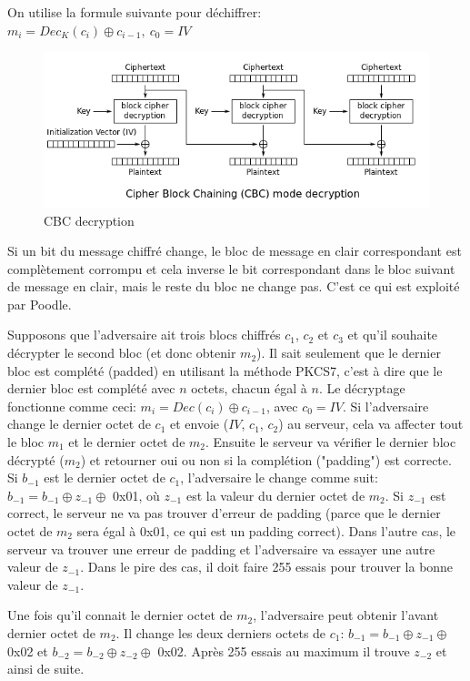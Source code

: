 \noindent On utilise la formule suivante pour déchiffrer: \\
$m_i = Dec_K(c_i) \oplus c_{i-1},\ c_0 = IV$ 

\begin{figure}[H]
\includegraphics[scale=0.6]{img/cbc-dec.png}
\caption{CBC decryption}
\label{cbc-dec}
\end{figure}

Si un bit du message chiffré change, le bloc de message en clair correspondant est complètement corrompu et cela inverse le bit correspondant dans le bloc suivant de message en clair, mais le reste du bloc ne change pas. C'est ce qui est exploité par Poodle.

Supposons que l'adversaire ait trois blocs chiffrés $c_1$, $c_2$ et $c_3$ et qu'il souhaite décrypter le second bloc (et donc obtenir $m_2$). Il sait seulement que le dernier bloc est complété (padded) en utilisant la méthode PKCS7, c'est à dire que le dernier bloc est complété avec $n$ octets, chacun égal à $n$.
Le décryptage fonctionne comme ceci: $m_i = Dec(c_i) \oplus c_{i-1}$, avec $c_0 = IV$. Si l'adversaire change le dernier octet de $c_1$ et envoie ($IV$, $c_1$, $c_2$) au serveur, cela va affecter tout le bloc $m_1$ et le dernier octet de $m_2$. Ensuite le serveur va vérifier le dernier bloc décrypté ($m_2$) et retourner oui ou non si la complétion ("padding") est correcte.
Si $b_{-1}$ est le dernier octet de $c_1$, l'adversaire le change comme suit: $b_{-1} = b_{-1} \oplus z_{-1} \oplus$ 0x01, où $z_{-1}$ est la valeur du dernier octet de $m_2$. Si $z_{-1}$ est correct, le serveur ne va pas trouver d'erreur de padding (parce que le dernier octet de $m_2$ sera égal à 0x01, ce qui est un padding correct). Dans l'autre cas, le serveur va trouver une erreur de padding et l'adversaire va essayer une autre valeur de $z_{-1}$. Dans le pire des cas, il doit faire 255 essais pour trouver la bonne valeur de $z_{-1}$.

Une fois qu'il connait le dernier octet de $m_2$, l'adversaire peut obtenir l'avant dernier octet de $m_2$. Il change les deux derniers octets de $c_1$: $b_{-1} = b_{-1} \oplus z_{-1} \oplus$ 0x02 et $b_{-2} = b_{-2} \oplus z_{-2} \oplus$ 0x02. Après 255 essais au maximum il trouve $z_{-2}$ et ainsi de suite. 

